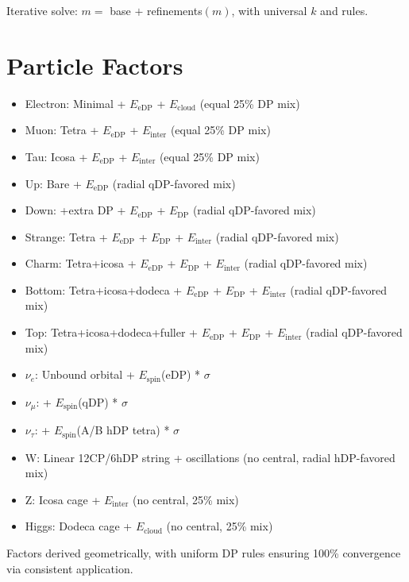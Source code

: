 \documentclass{article}
\begin{document}
Iterative solve: $m =$ base $+$ refinements$(m)$, with universal $k$ and rules.

\section{Particle Factors}

\begin{itemize}
\item Electron: Minimal + $E_{\text{eDP}}$ + $E_{\text{cloud}}$ (equal 25\% DP mix)
\item Muon: Tetra + $E_{\text{eDP}}$ + $E_{\text{inter}}$ (equal 25\% DP mix)
\item Tau: Icosa + $E_{\text{eDP}}$ + $E_{\text{inter}}$ (equal 25\% DP mix)
\item Up: Bare + $E_{\text{eDP}}$ (radial qDP-favored mix)
\item Down: +extra DP + $E_{\text{eDP}}$ + $E_{\text{DP}}$ (radial qDP-favored mix)
\item Strange: Tetra + $E_{\text{eDP}}$ + $E_{\text{DP}}$ + $E_{\text{inter}}$ (radial qDP-favored mix)
\item Charm: Tetra+icosa + $E_{\text{eDP}}$ + $E_{\text{DP}}$ + $E_{\text{inter}}$ (radial qDP-favored mix)
\item Bottom: Tetra+icosa+dodeca + $E_{\text{eDP}}$ + $E_{\text{DP}}$ + $E_{\text{inter}}$ (radial qDP-favored mix)
\item Top: Tetra+icosa+dodeca+fuller + $E_{\text{eDP}}$ + $E_{\text{DP}}$ + $E_{\text{inter}}$ (radial qDP-favored mix)
\item $\nu_e$: Unbound orbital + $E_{\text{spin}}$(eDP) * $\sigma$
\item $\nu_\mu$: + $E_{\text{spin}}$(qDP) * $\sigma$
\item $\nu_\tau$: + $E_{\text{spin}}$(A/B hDP tetra) * $\sigma$
\item W: Linear 12CP/6hDP string + oscillations (no central, radial hDP-favored mix)
\item Z: Icosa cage + $E_{\text{inter}}$ (no central, 25\% mix)
\item Higgs: Dodeca cage + $E_{\text{cloud}}$ (no central, 25\% mix)
\end{itemize}

Factors derived geometrically, with uniform DP rules ensuring 100\% convergence via consistent application.
\end{document}
